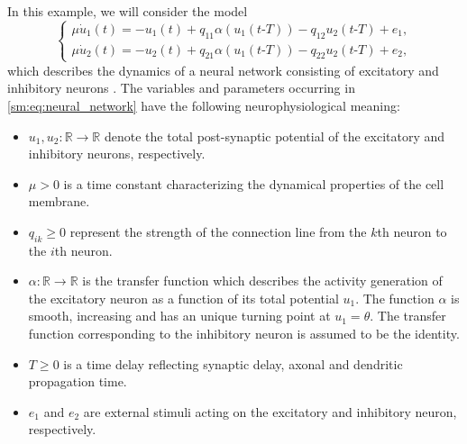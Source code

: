 In this example, we will consider the model 
\begin{equation}
\label{sm:eq:neural_network}
\begin{cases}
\mu\dot{u}_1(t) = -u_1(t) + q_{11}\alpha(u_1(t\text{-}T))-q_{12}u_2(t\text{-}T) + e_1,\\
\mu\dot{u}_2(t) = -u_2(t) + q_{21}\alpha(u_1(t\text{-}T))-q_{22}u_2(t\text{-}T) + e_2,
\end{cases}
\end{equation}
which describes the dynamics of a neural network consisting of
excitatory and inhibitory neurons \cite{giannakopoulos2001bifurcations}.
The variables and parameters occurring in \cref{sm:eq:neural_network}
have the following neurophysiological meaning:
\begin{itemize}
\item $u_1,u_2:\mathbb{R}\rightarrow\mathbb{R}$ denote the total post-synaptic
potential of the excitatory and inhibitory neurons, respectively.
\item $\mu>0$ is a time constant characterizing the dynamical properties
of the cell membrane.
\item $q_{ik}\geq0$ represent the strength of the connection line from
the $k$th neuron to the $i$th neuron.
\item $\alpha:\mathbb{R}\rightarrow\mathbb{R}$ is the transfer function
which describes the activity generation of the excitatory neuron as
a function of its total potential $u_1$. The function $\alpha$
is smooth, increasing and has an unique turning point at $u_1 = \theta$.
The transfer function corresponding to the inhibitory neuron is assumed
to be the identity.
\item $T\geq0$ is a time delay reflecting synaptic delay, axonal and dendritic
propagation time.
\item $e_1$ and $e_2$ are external stimuli acting on the excitatory
and inhibitory neuron, respectively.
\end{itemize}

